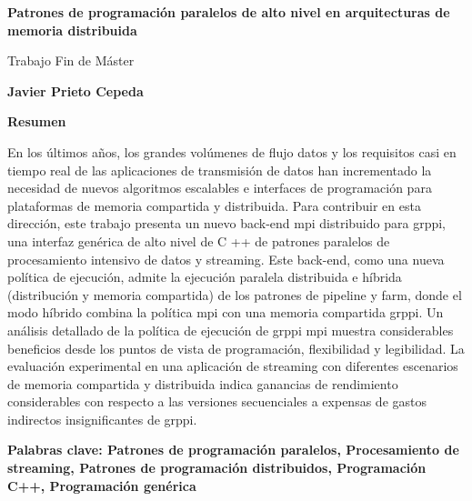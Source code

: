 % 
% 
%


\thispagestyle{plain}



\begin{center}
    \Large
    \textbf{Patrones de programación paralelos de alto nivel en arquitecturas de memoria distribuida}
    
    \vspace{0.4cm}
    \large
    Trabajo Fin de Máster
    
    \vspace{0.4cm}
    \textbf{Javier Prieto Cepeda}
    
    \vspace{0.9cm}
    \textbf{Resumen}
\end{center}

En los últimos años, los grandes volúmenes de flujo datos y los requisitos casi en tiempo real de las aplicaciones de transmisión de datos han incrementado la necesidad de nuevos algoritmos escalables e interfaces de programación para plataformas de memoria compartida y distribuida. Para contribuir en esta dirección, este trabajo presenta un nuevo back-end \acrshort{mpi} distribuido para \acrshort{grppi}, una interfaz genérica de alto nivel de C ++ de patrones paralelos de procesamiento intensivo de datos y streaming. Este back-end, como una nueva política de ejecución, admite la ejecución paralela distribuida e híbrida (distribución y memoria compartida) de los patrones de pipeline y farm, donde el modo híbrido combina la política \acrshort{mpi} con una memoria compartida \acrshort{grppi}. %
Un análisis detallado de la política de ejecución de \acrshort{grppi} \acrshort{mpi} muestra considerables beneficios desde los puntos de vista de programación, flexibilidad y legibilidad. La evaluación experimental en una aplicación de streaming con diferentes escenarios de memoria compartida y distribuida indica ganancias de rendimiento considerables con respecto a las versiones secuenciales a expensas de gastos indirectos insignificantes de \acrshort{grppi}.


\vspace{0.7cm}

\textbf{Palabras clave: Patrones de programación paralelos, Procesamiento de streaming, Patrones de programación distribuidos, Programación C++, Programación genérica}

\afterpage{\blankpage} %